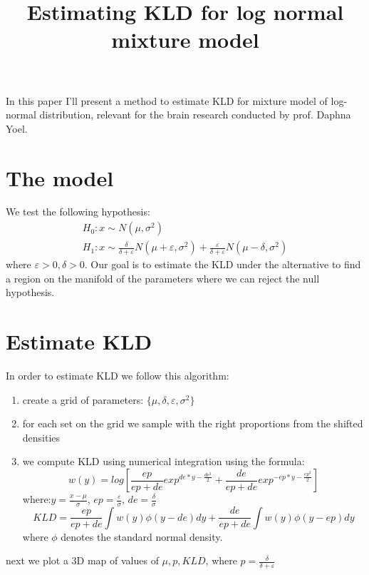 \documentclass[12pt]{article}
\title{Estimating KLD for log normal mixture model}
\begin{document}
\maketitle
In this paper I'll present a method to estimate KLD for mixture model of log-normal distribution, relevant for the brain research conducted by prof. Daphna Yoel.
\section{The model}
We test the following hypothesis:
\begin{gather} 
H_0: x \sim N(\mu, \sigma^2) \\
H_1: x \sim \frac{\delta}{\delta + \varepsilon} N(\mu + \varepsilon, \sigma^2) + \frac{\varepsilon}{\delta + \varepsilon} N(\mu - \delta , \sigma^2)
\end{gather}
where $\varepsilon > 0, \delta > 0$. Our goal is to estimate the KLD under the alternative to find a region on the manifold of the parameters where we can reject the null hypothesis.
\section{Estimate KLD}
In order to estimate KLD we follow this algorithm:
	\begin{enumerate}
	 \item create a grid of parameters: $\{\mu,\delta,\varepsilon,\sigma^2\}$
	 \item for each set on the grid we sample with the right proportions from the shifted densities
	 \item we compute KLD using numerical integration using the formula:
	 \[
	 w(y) = log[\frac{ep}{ep+de}exp^{de*y-\frac{de^2}{2}}+\frac{de}{ep+de}exp^{-ep*y-\frac{ep^2}{2}}] 
	 \]
	 where:$y = \frac{x - \mu}{\sigma}$, $ep = \frac{\varepsilon}{\sigma}$, $de = \frac{\delta}{\sigma}$
	 \begin{equation}
	 KLD = \frac{ep}{ep+de}\int w(y) \phi(y - de) dy + 
	 \frac{de}{ep+de}\int w(y) \phi(y - ep) dy
	 \end{equation}
	 where $\phi$ denotes the standard normal density.
	\end{enumerate} 
	next we plot a 3D map of values of $\mu,p, KLD$, where $p = \frac{\delta}{\delta + \varepsilon}$
\end{document}
